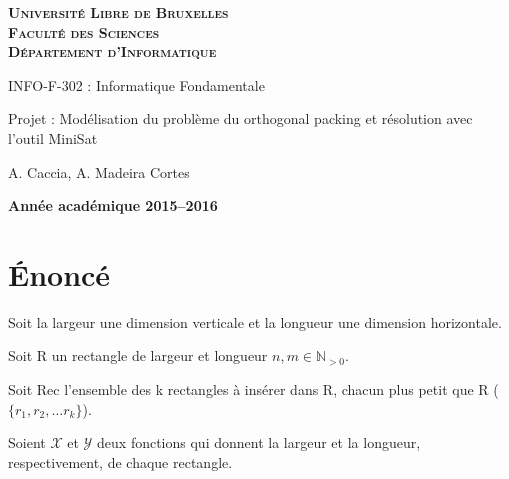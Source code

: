 \documentclass[a4paper,10pt]{article}
\begin{document}
\begin{titlepage}
    \begin{center}
        \textbf{\textsc{Université Libre de Bruxelles}}\\
        \textbf{\textsc{Faculté des Sciences}}\\
        \textbf{\textsc{Département d'Informatique}}

        \vfill{}
        \vfill{}

        \begin{center}
            {\Huge INFO-F-302 : Informatique Fondamentale}
        \end{center}

        {\Huge \par}

        \begin{center}
            {\LARGE Projet : Modélisation du problème du orthogonal packing et résolution avec l’outil MiniSat}
        \end{center}

        {\Huge \par}

        \begin{center}
            {\large A. Caccia, A. Madeira Cortes}
        \end{center}

        {\Huge \par}
        \vfill{}
        \vfill{}

        {\large\par}
        \vfill{}
        \vfill{}

        \textbf{Année académique 2015--2016}
    \end{center}
\end{titlepage}

\tableofcontents
\newpage

\section{Énoncé}

Soit la largeur une dimension verticale et la longueur une dimension horizontale.

Soit R un rectangle de largeur et longueur $n, m \in \mathbb{N}_{>0}$.

Soit Rec l'ensemble des k rectangles à insérer dans R, chacun plus petit que R ( $\{ r_1, r_2, \ldots r_k \}$).

Soient $\mathcal{X}$ et $\mathcal{Y}$ deux fonctions qui donnent la largeur et la longueur, respectivement, de chaque rectangle.
\end{document}
